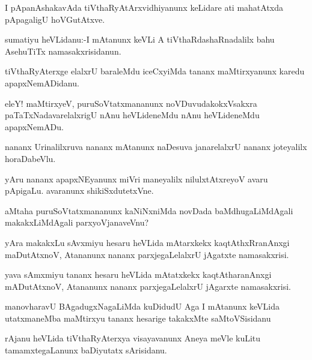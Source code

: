 \documentclass{article}
\begin{document}
\begin{mn}%
I pApanAshakavAda tiVthaRyAtArxvidhiyanunx keLidare ati mahatAtxda pApagaligU hoVGutAtxve.
\end{mn}

\begin{mn}%
sumatiyu heVLidanu:-I mAtanunx keVLi A tiVthaRdashaRnadalilx bahu AsehuTiTx 
namasakxrisidanun.
\end{mn}

\begin{mn}%
tiVthaRyAterxge elalxrU baraleMdu iceCxyiMda tananx maMtirxyanunx karedu apapxNemADidanu.
\end{mn}

\begin{mn}%
eleY! maMtirxyeV, puruSoVtatxmananunx noVDuvudakokxVsakxra paTaTxNadavarelalxrigU nAnu 
heVLideneMdu nAnu heVLideneMdu apapxNemADu.
\end{mn}

\begin{mn}%
nananx Urinalilxruva nananx mAtanunx naDesuva janarelalxrU nananx joteyalilx horaDabeVlu.
\end{mn}

\begin{mn}%
yAru nananx apapxNEyanunx miVri maneyalilx nilulxtAtxreyoV avaru pApigaLu. avaranunx 
shikiSxdutetxVne.
\end{mn}

\begin{mn}%
aMtaha puruSoVtatxmananunx kaNiNxniMda novDada baMdhugaLiMdAgali makakxLiMdAgali 
parxyoVjanaveVnu?
\end{mn}

\begin{mn}%
yAra makakxLu sAvxmiyu hesaru heVLida mAtarxkekx kaqtAthxRranAnxgi maDutAtxnoV, Atananunx
nananx parxjegaLelalxrU jAgatxte namasakxrisi. 
\end{mn}

\begin{mn}%
yava sAmxmiyu tananx hesaru heVLida mAtatxkekx kaqtAtharanAnxgi mADutAtxnoV, Atananunx 
nananx parxjegaLelalxrU jAgarxte namasakxrisi.
\end{mn}

\begin{mn}%
manovharavU BAgadugxNagaLiMda kuDidudU Aga I mAtanunx keVLida utatxmaneMba maMtirxyu tananx 
hesarige takakxMte saMtoVSisidanu
\end{mn}

\begin{mn}%
rAjanu heVLida tiVthaRyAterxya visayavanunx Aneya meVle kuLitu tamamxtegaLanunx baDiyutatx 
sArisidanu.
\end{mn}
\end{document}
